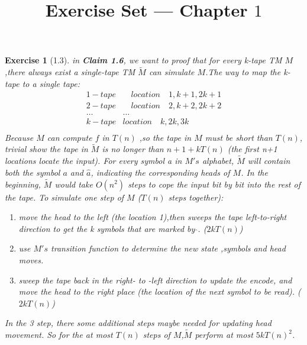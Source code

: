 \documentclass[a4paper]{article}
\title{Exercise Set --- Chapter $1$}
\date{}
\newtheorem*{exercise}{Exercise}
\begin{document}
\maketitle

\begin{exercise}[1.3]
	in \textbf{Claim 1.6}, we want to proof that for every k-tape TM $M$,there always exist a single-tape TM $\widetilde{M}$ can simulate $M$.The way to map the k-tape to a single tape:
		$$
        \begin{matrix}		
			 1-tape&\quad location\quad 1, k+1, 2k+1\\			
			 2-tape&\quad location\quad 2, k+2, 2k+2\\			
			 \dots&\dots\\			
			 k-tape&location\quad k, 2k, 3k\\			
		\end{matrix}
        $$
	Because $M$ can compute $f$ in $T(n)$ ,so the tape in $M$ must be short than $T(n)$, trivial show the tape in $\widetilde{M}$ is no longer than $n+1+kT(n)$ (the first n+1 locations locate the input).
	For every symbol a in $M's$ alphabet, $\widetilde{M}$ will contain both the symbol $a$ and $\widehat{a}$, indicating the corresponding heads of $M$. 
	In the beginning, $\widetilde{M}$ would take $O(n^2)$ steps to cope the input bit by bit into the rest of the tape.
	To simulate one step of $M$ ($T(n)$ steps together):
    \begin{enumerate}
        \item move the head to the left (the location 1),then sweeps the tape left-to-right direction to get the k symbols that are marked by $\widehat{ }$. \quad ($2kT(n)$)
        \item use $M's$ transition function to determine the new state ,symbols and head moves.
        \item sweep the tape back in the right- to -left direction to update the encode, and move the head to the right place (the location of the next symbol to be read). \quad ($2kT(n)$)
    \end{enumerate}
	In the 3 step, there some additional steps maybe needed for updating head movement. 
	So for the at most $T(n)$ steps of $M$,$\widetilde{M}$ perform at most $5kT(n)^2$. 
\end{exercise}
\end{document}
